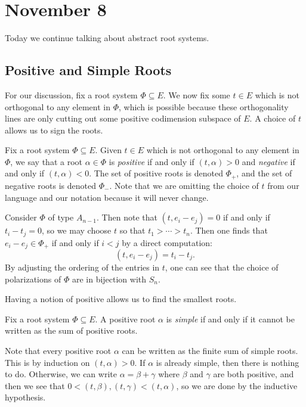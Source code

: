 \documentclass[../notes.tex]{subfiles}
\begin{document}
\section{November 8}
Today we continue talking about abstract root systems.

\subsection{Positive and Simple Roots}
For our discussion, fix a root system $\Phi\subseteq E$. We now fix some $t\in E$ which is not orthogonal to any element in $\Phi$, which is possible because these orthogonality lines are only cutting out some positive codimension subspace of $E$. A choice of $t$ allows us to sign the roots.
\begin{definition}[positive]
	Fix a root system $\Phi\subseteq E$. Given $t\in E$ which is not orthogonal to any element in $\Phi$, we say that a root $\alpha\in\Phi$ is \textit{positive} if and only if $(t,\alpha)>0$ and \textit{negative} if and only if $(t,\alpha)<0$. The set of positive roots is denoted $\Phi_+$, and the set of negative roots is denoted $\Phi_-$. Note that we are omitting the choice of $t$ from our language and our notation because it will never change.
\end{definition}
\begin{example}
	Consider $\Phi$ of type $A_{n-1}$. Then note that $(t,e_i-e_j)=0$ if and only if $t_i-t_j=0$, so we may choose $t$ so that $t_1>\cdots>t_n$. Then one finds that $e_i-e_j\in\Phi_+$ if and only if $i<j$ by a direct computation:
	\[(t,e_i-e_j)=t_i-t_j.\]
	By adjusting the ordering of the entries in $t$, one can see that the choice of polarizations of $\Phi$ are in bijection with $S_n$.
\end{example}
Having a notion of positive allows us to find the smallest roots.
\begin{definition}[simple]
	Fix a root system $\Phi\subseteq E$. A positive root $\alpha$ is \textit{simple} if and only if it cannot be written as the sum of positive roots.
\end{definition}
\begin{remark}
	Note that every positive root $\alpha$ can be written as the finite sum of simple roots. This is by induction on $(t,\alpha)>0$. If $\alpha$ is already simple, then there is nothing to do. Otherwise, we can write $\alpha=\beta+\gamma$ where $\beta$ and $\gamma$ are both positive, and then we see that $0<(t,\beta),(t,\gamma)<(t,\alpha)$, so we are done by the inductive hypothesis.
\end{remark}
\end{document}
